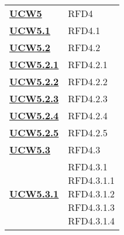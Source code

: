 \begin{longtable}[H]{| >{\centering\bfseries}p{8cm} | >{\centering\arraybackslash}p{8cm} |}
    \hyperref[sub:ucw5]{UCW5}          & RFD4                                                                      \\

    \hyperref[ssub:ucw5.1]{UCW5.1}     & RFD4.1                                                                    \\

    \hyperref[ssub:ucw5.2]{UCW5.2}     & RFD4.2                                                                    \\

    \hyperref[par:ucw5.2.1]{UCW5.2.1}  & RFD4.2.1                                                                  \\

    \hyperref[par:ucw5.2.2]{UCW5.2.2}  & RFD4.2.2                                                                  \\

    \hyperref[par:ucw5.2.3]{UCW5.2.3}  & RFD4.2.3                                                                  \\

    \hyperref[par:ucw5.2.4]{UCW5.2.4}  & RFD4.2.4                                                                  \\

    \hyperref[par:ucw5.2.5]{UCW5.2.5}  & RFD4.2.5                                                                  \\

    \hyperref[ssub:ucw5.3]{UCW5.3}     & RFD4.3                                                                    \\

    \hyperref[par:ucw5.3.1]{UCW5.3.1}  & \makecell{
        \rule{0pt}{4ex}
    RFD4.3.1                                                                                                     \\
    RFD4.3.1.1                                                                                                   \\
    RFD4.3.1.2                                                                                                   \\
    RFD4.3.1.3                                                                                                   \\
        RFD4.3.1.4
        \rule{0pt}{4ex}
    }                                                                                                            \\


\end{longtable}
